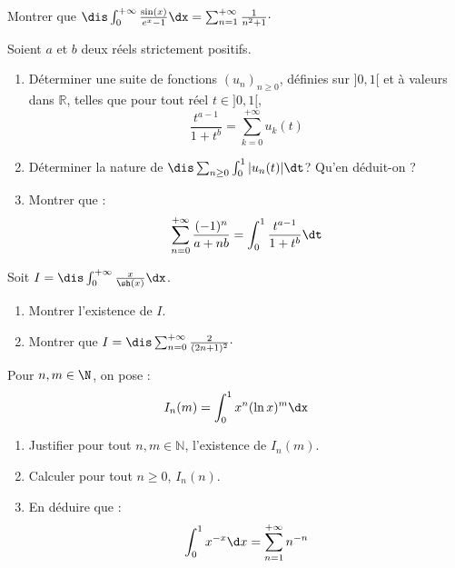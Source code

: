 \documentclass[a4paper,10pt]{report}
\begin{document}
\medskip

\begin{Exercice}{} Montrer que $\dis \int_{0}^{+ \infty} \frac{\sin(x)}{e^x-1} \dx = \sum_{n=1}^{+ \infty} \frac{1}{n^2+1}\cdot$
\end{Exercice}



\begin{Exercice}{} Soient $a$ et $b$ deux réels strictement positifs.
\begin{enumerate}
\item Déterminer une suite de fonctions $(u_n)_{n \geq 0}$, définies sur $]0,1[$ et à valeurs dans $\mathbb{R}$, telles que pour tout réel $t \in ]0,1[$,
$$ \dfrac{t^{a-1}}{1+t^b} = \sum_{k=0}^{+ \infty} u_k(t)$$
\item Déterminer la nature de $\dis \sum_{n \geq 0} \int_0^1 \vert u_n(t) \vert \dt$? Qu'en déduit-on ?
\item Montrer que :
$$ \sum_{n=0}^{+ \infty} \dfrac{(-1)^n}{a+nb} = \int_0^1 \dfrac{t^{a-1}}{1+t^b} \dt$$
\end{enumerate}
\end{Exercice}


 


\begin{Exercice}{}\label{gamma} Soit $I = \dis \int_{0}^{+ \infty} \frac{x}{\sh(x)} \dx$.

\begin{enumerate}
\item Montrer l'existence de $I$.
\item Montrer que $I= \dis \sum_{n=0}^{+ \infty} \frac{2}{(2n+1)^2}\cdot$
\end{enumerate}
\end{Exercice} 



 
\begin{Exercice}{} Pour $n,m \in \N$, on pose :
  \[
  I_{n}(m) = \int_{0}^{1} x^{n}(\ln x)^{m} \dx
  \]
  \begin{enumerate}
  \item Justifier pour tout $n,m \in \mathbb{N}$, l'existence de $I_n(m)$.
  \item Calculer pour tout $n \geq 0$, $I_{n}(n)$.
  \item
    En déduire que :
    \[
    \int_{0}^{1} x^{ - x} \d x = \sum_{n = 1}^{ + \infty} n^{ - n}
    \]
  \end{enumerate}
\end{Exercice}
\end{document}
